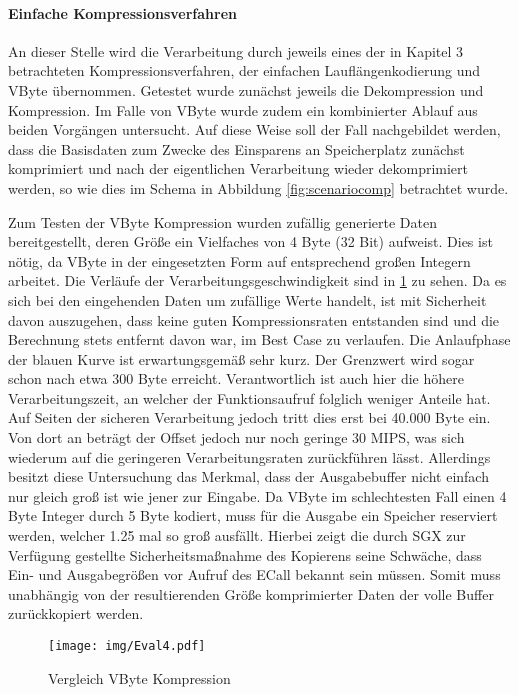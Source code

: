 \paragraph{Einfache Kompressionsverfahren}

An dieser Stelle wird die Verarbeitung durch jeweils eines der in Kapitel 3 betrachteten Kompressionsverfahren, der einfachen Lauflängenkodierung und VByte übernommen. Getestet wurde zunächst jeweils die Dekompression und Kompression. Im Falle von VByte wurde zudem ein kombinierter Ablauf aus beiden Vorgängen untersucht. Auf diese Weise soll der Fall nachgebildet werden, dass die Basisdaten zum Zwecke des Einsparens an Speicherplatz zunächst komprimiert und nach der eigentlichen Verarbeitung wieder dekomprimiert werden, so wie dies im Schema in Abbildung \ref{fig:scenariocomp} betrachtet wurde.

Zum Testen der VByte Kompression wurden zufällig generierte Daten bereitgestellt, deren Größe ein Vielfaches von 4 Byte (32 Bit) aufweist. Dies ist nötig, da VByte in der eingesetzten Form auf entsprechend großen Integern arbeitet. Die Verläufe der Verarbeitungsgeschwindigkeit sind in \ref{fig:eval4} zu sehen. Da es sich bei den eingehenden Daten um zufällige Werte handelt, ist mit Sicherheit davon auszugehen, dass keine guten Kompressionsraten entstanden sind und die Berechnung stets entfernt davon war, im Best Case zu verlaufen. Die Anlaufphase der blauen Kurve ist erwartungsgemäß sehr kurz. Der Grenzwert wird sogar schon nach etwa 300 Byte erreicht. Verantwortlich ist auch hier die höhere Verarbeitungszeit, an welcher der Funktionsaufruf folglich weniger Anteile hat. Auf Seiten der sicheren Verarbeitung jedoch tritt dies erst bei 40.000 Byte ein. Von dort an beträgt der Offset jedoch nur noch geringe 30 \ac{MIPS}, was sich wiederum auf die geringeren Verarbeitungsraten zurückführen lässt. Allerdings besitzt diese Untersuchung das Merkmal, dass der Ausgabebuffer nicht einfach nur gleich groß ist wie jener zur Eingabe. Da VByte im schlechtesten Fall einen 4 Byte Integer durch 5 Byte kodiert, muss für die Ausgabe ein Speicher reserviert werden, welcher 1.25 mal so groß ausfällt. Hierbei zeigt die durch \ac{SGX} zur Verfügung gestellte Sicherheitsmaßnahme des Kopierens seine Schwäche, dass Ein- und Ausgabegrößen vor Aufruf des \ac{ECall} bekannt sein müssen. Somit muss unabhängig von der resultierenden Größe komprimierter Daten der volle Buffer zurückkopiert werden.

\begin{figure}[h]
	\texttt{[image: img/Eval4.pdf]}
	\centering
	\caption{Vergleich VByte Kompression}
	\label{fig:eval4}
\end{figure}

